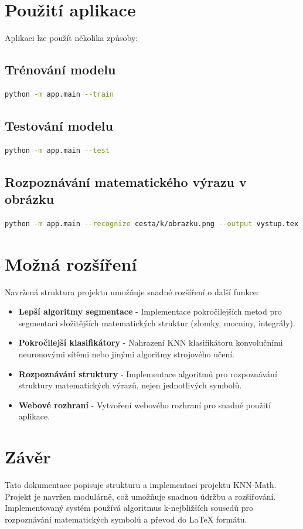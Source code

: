 \documentclass[12pt,a4paper]{article}
\begin{document}
\section{Použití aplikace}

Aplikaci lze použít několika způsoby:

\subsection{Trénování modelu}

\begin{lstlisting}[language=bash]
python -m app.main --train
\end{lstlisting}

\subsection{Testování modelu}

\begin{lstlisting}[language=bash]
python -m app.main --test
\end{lstlisting}

\subsection{Rozpoznávání matematického výrazu v obrázku}

\begin{lstlisting}[language=bash]
python -m app.main --recognize cesta/k/obrazku.png --output vystup.tex
\end{lstlisting}

\section{Možná rozšíření}

Navržená struktura projektu umožňuje snadné rozšíření o další funkce:

\begin{itemize}
    \item \textbf{Lepší algoritmy segmentace} - Implementace pokročilejších metod pro segmentaci složitějších matematických struktur (zlomky, mocniny, integrály).
    
    \item \textbf{Pokročilejší klasifikátory} - Nahrazení KNN klasifikátoru konvolučními neuronovými sítěmi nebo jinými algoritmy strojového učení.
    
    \item \textbf{Rozpoznávání struktury} - Implementace algoritmů pro rozpoznávání struktury matematických výrazů, nejen jednotlivých symbolů.
    
    \item \textbf{Webové rozhraní} - Vytvoření webového rozhraní pro snadné použití aplikace.
\end{itemize}

\section{Závěr}

Tato dokumentace popisuje strukturu a implementaci projektu KNN-Math. Projekt je navržen modulárně, což umožňuje snadnou údržbu a rozšiřování. Implementovaný systém používá algoritmus k-nejbližších sousedů pro rozpoznávání matematických symbolů a převod do LaTeX formátu.
\end{document}
